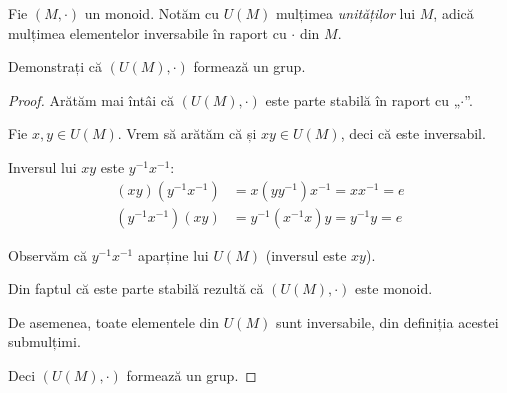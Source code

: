 \begin{exercise}
Fie \((M, \cdot)\) un monoid. Notăm cu \(U(M)\) mulțimea \emph{unităților} lui \(M\), adică mulțimea elementelor inversabile în raport cu \(\cdot\) din \(M\).

Demonstrați că \((U(M), \cdot)\) formează un grup.
\end{exercise}
\begin{proof}
Arătăm mai întâi că \((U(M), \cdot)\) este parte stabilă în raport cu „\(\cdot\)”.

Fie \(x, y \in U(M)\). Vrem să arătăm că și \(x y \in U(M)\), deci că este inversabil.

Inversul lui \(x y\) este \(y^{-1} x^{-1}\):
\begin{align*}
    (x y) (y^{-1} x^{-1}) &= x (y y^{-1}) x^{-1} = x x^{-1} = e \\
    (y^{-1} x^{-1}) (x y) &= y^{-1} (x^{-1} x) y = y^{-1} y = e
\end{align*}

Observăm că \(y^{-1} x^{-1}\) aparține lui \(U(M)\) (inversul este \(x y\)).

Din faptul că este parte stabilă rezultă că \((U(M), \cdot)\) este monoid.

De asemenea, toate elementele din \(U(M)\) sunt inversabile, din definiția acestei submulțimi.

Deci \((U(M), \cdot)\) formează un grup.
\end{proof}

